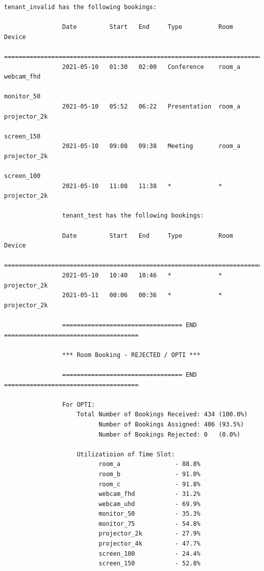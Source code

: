 \documentclass{article}
\begin{document}
\begin{Verbatim}[gobble=8]
                tenant_invalid has the following bookings:
                
                Date         Start   End     Type          Room     Device
                ===========================================================================
                2021-05-10   01:30   02:00   Conference    room_a   webcam_fhd
                                                                    monitor_50
                2021-05-10   05:52   06:22   Presentation  room_a   projector_2k
                                                                    screen_150
                2021-05-10   09:08   09:38   Meeting       room_a   projector_2k
                                                                    screen_100
                2021-05-10   11:08   11:38   *             *        projector_2k
                
                tenant_test has the following bookings:
                
                Date         Start   End     Type          Room     Device
                ===========================================================================
                2021-05-10   10:40   10:46   *             *        projector_2k
                2021-05-11   00:06   00:36   *             *        projector_2k
                
                ================================= END =====================================
                
                *** Room Booking - REJECTED / OPTI ***
                
                ================================= END =====================================
                
                For OPTI:
                    Total Number of Bookings Received: 434 (100.0%)
                          Number of Bookings Assigned: 406 (93.5%)
                          Number of Bookings Rejected: 0   (0.0%)
                
                    Utilizatioion of Time Slot:
                          room_a               - 88.8%
                          room_b               - 91.0%
                          room_c               - 91.8%
                          webcam_fhd           - 31.2%
                          webcam_uhd           - 69.9%
                          monitor_50           - 35.3%
                          monitor_75           - 54.8%
                          projector_2k         - 27.9%
                          projector_4k         - 47.7%
                          screen_100           - 24.4%
                          screen_150           - 52.8%
                

\end{Verbatim}
\end{document}
